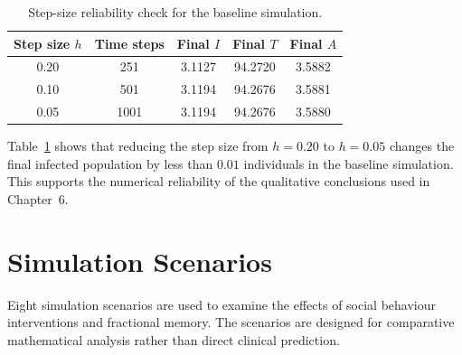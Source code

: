 \documentclass[12pt,a4paper,oneside]{report}
\begin{document}
\begin{table}[H]
\centering
\caption{Step-size reliability check for the baseline simulation.}
\label{tab:step_size_reliability}
\small
\begin{tabular}{ccccc}
\toprule
Step size $h$ & Time steps & Final $I$ & Final $T$ & Final $A$\\
\midrule
0.20 & 251 & 3.1127 & 94.2720 & 3.5882\\
0.10 & 501 & 3.1194 & 94.2676 & 3.5881\\
0.05 & 1001 & 3.1194 & 94.2676 & 3.5880\\
\bottomrule
\end{tabular}
\end{table}

Table~\ref{tab:step_size_reliability} shows that reducing the step size from $h=0.20$ to $h=0.05$ changes the final infected population by less than $0.01$ individuals in the baseline simulation. This supports the numerical reliability of the qualitative conclusions used in Chapter~6.

\section{Simulation Scenarios}

Eight simulation scenarios are used to examine the effects of social behaviour interventions and fractional memory. The scenarios are designed for comparative mathematical analysis rather than direct clinical prediction.
\end{document}
